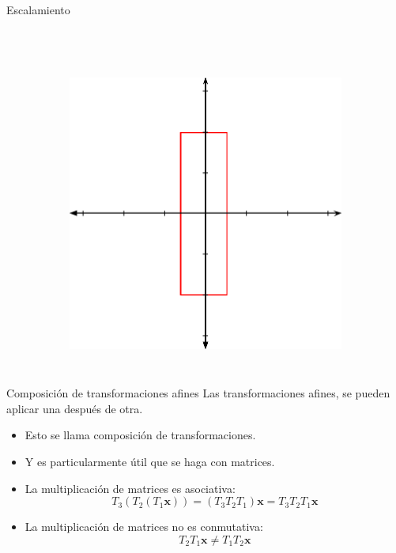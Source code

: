 \begin{frame}{Escalamiento}
\begin{columns}
\begin{figure}[htp]
\begin{subfigure}[b]{0.4\textwidth}
 \end{subfigure}
\\
\vspace{0.15cm}
 \begin{subfigure}[b]{0.4\textwidth}
   \includegraphics[width=\textwidth]{img/Scalated}
 \end{subfigure}
\end{figure}
\end{columns}
\end{frame}

\begin{frame}{Composición de transformaciones afines}
Las transformaciones afines, se pueden aplicar una después de otra. 
\begin{itemize}
    \item Esto se llama \alert{composición de transformaciones}.
    \item Y es particularmente útil que se haga con matrices.
    \item La multiplicación de matrices es asociativa:
    $$ T_3 (T_2 (T_1 \mathbf{x})) = (T_3 T_2 T_1) \mathbf{x} = T_3 T_2 T_1 \mathbf{x}$$
    \item La multiplicación de matrices \alert{no es} conmutativa: 
    $$T_2 T_1 \mathbf{x} \neq T_1 T_2 \mathbf{x}$$
\end{itemize}
\end{frame}

